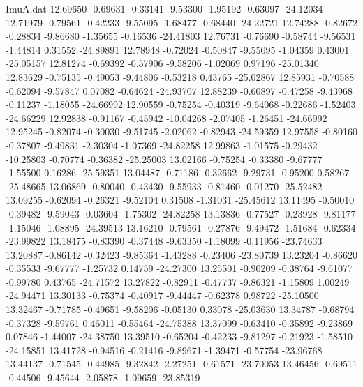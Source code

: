 \begin{filecontents}{ImuA.dat}
  12.69650   -0.69631   -0.33141   -9.53300   -1.95192   -0.63097  -24.12034
  12.71979   -0.79561   -0.42233   -9.55095   -1.68477   -0.68440  -24.22721
  12.74288   -0.82672   -0.28834   -9.86680   -1.35655   -0.16536  -24.41803
  12.76731   -0.76690   -0.58744   -9.56531   -1.44814    0.31552  -24.89891
  12.78948   -0.72024   -0.50847   -9.55095   -1.04359    0.43001  -25.05157
  12.81274   -0.69392   -0.57906   -9.58206   -1.02069    0.97196  -25.01340
  12.83629   -0.75135   -0.49053   -9.44806   -0.53218    0.43765  -25.02867
  12.85931   -0.70588   -0.62094   -9.57847    0.07082   -0.64624  -24.93707
  12.88239   -0.60897   -0.47258   -9.43968   -0.11237   -1.18055  -24.66992
  12.90559   -0.75254   -0.40319   -9.64068   -0.22686   -1.52403  -24.66229
  12.92838   -0.91167   -0.45942  -10.04268   -2.07405   -1.26451  -24.66992
  12.95245   -0.82074   -0.30030   -9.51745   -2.02062   -0.82943  -24.59359
  12.97558   -0.80160   -0.37807   -9.49831   -2.30304   -1.07369  -24.82258
  12.99863   -1.01575   -0.29432  -10.25803   -0.70774   -0.36382  -25.25003
  13.02166   -0.75254   -0.33380   -9.67777   -1.55500    0.16286  -25.59351
  13.04487   -0.71186   -0.32662   -9.29731   -0.95200    0.58267  -25.48665
  13.06869   -0.80040   -0.43430   -9.55933   -0.81460   -0.01270  -25.52482
  13.09255   -0.62094   -0.26321   -9.52104    0.31508   -1.31031  -25.45612
  13.11495   -0.50010   -0.39482   -9.59043   -0.03604   -1.75302  -24.82258
  13.13836   -0.77527   -0.23928   -9.81177   -1.15046   -1.08895  -24.39513
  13.16210   -0.79561   -0.27876   -9.49472   -1.51684   -0.62334  -23.99822
  13.18475   -0.83390   -0.37448   -9.63350   -1.18099   -0.11956  -23.74633
  13.20887   -0.86142   -0.32423   -9.85364   -1.43288   -0.23406  -23.80739
  13.23204   -0.86620   -0.35533   -9.67777   -1.25732    0.14759  -24.27300
  13.25501   -0.90209   -0.38764   -9.61077   -0.99780    0.43765  -24.71572
  13.27822   -0.82911   -0.47737   -9.86321   -1.15809    1.00249  -24.94471
  13.30133   -0.75374   -0.40917   -9.44447   -0.62378    0.98722  -25.10500
  13.32467   -0.71785   -0.49651   -9.58206   -0.05130    0.33078  -25.03630
  13.34787   -0.68794   -0.37328   -9.59761    0.46011   -0.55464  -24.75388
  13.37099   -0.63410   -0.35892   -9.23869    0.07846   -1.44007  -24.38750
  13.39510   -0.65204   -0.42233   -9.81297   -0.21923   -1.58510  -24.15851
  13.41728   -0.94516   -0.21416   -9.89671   -1.39471   -0.57754  -23.96768
  13.44137   -0.71545   -0.44985   -9.32842   -2.27251   -0.61571  -23.70053
  13.46456   -0.69511   -0.44506   -9.45644   -2.05878   -1.09659  -23.85319

\end{filecontents}
